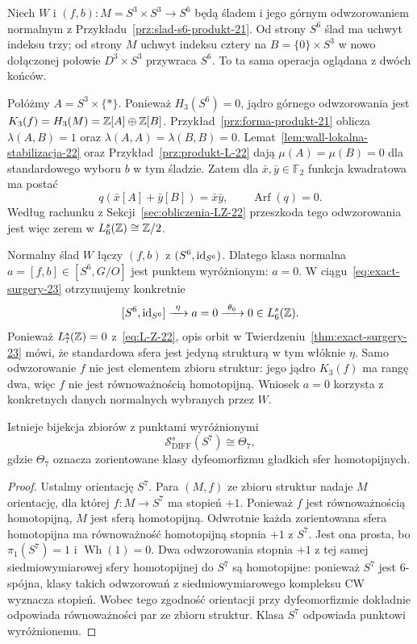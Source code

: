\clearpage
\begin{przyklad}
\label{prz:slad-s6-ciag-23}
Niech $W$ i $(f,b):M=S^3\times S^3\to S^6$
będą śladem i jego górnym odwzorowaniem normalnym z
Przykładu~\ref{prz:slad-s6-produkt-21}.
Od strony $S^6$ ślad ma uchwyt indeksu trzy;
od strony $M$ uchwyt indeksu cztery na
$B=\{0\}\times S^3$ w nowo dołączonej
połowie $D^3\times S^3$ przywraca $S^6$.
To ta sama operacja oglądana z dwóch końców.

Połóżmy $A=S^3\times\{*\}$. Ponieważ
$H_3(S^6)=0$, jądro górnego odwzorowania jest
$K_3(f)=H_3(M)=\mathbb{Z}[A]\oplus\mathbb{Z}[B]$.
Przykład~\ref{prz:forma-produkt-21} oblicza
$\lambda(A,B)=1$ oraz
$\lambda(A,A)=\lambda(B,B)=0$.
Lemat~\ref{lem:wall-lokalna-stabilizacja-22}
oraz Przykład~\ref{prz:produkt-L-22} dają
$\mu(A)=\mu(B)=0$ dla standardowego wyboru
$b$ w tym śladzie. Zatem dla
$\bar x,\bar y\in\mathbb F_2$ funkcja
kwadratowa ma postać
\[
 q(\bar x[A]+\bar y[B])=\bar x\bar y,
 \qquad \operatorname{Arf}(q)=0.
\]
Według rachunku z
Sekcji~\ref{sec:obliczenia-LZ-22}
przeszkoda tego odwzorowania jest więc zerem
w $L_6^s(\mathbb{Z})\cong\mathbb{Z}/2$.

Normalny ślad $W$ łączy $(f,b)$ z
$(S^6,\mathrm{id}_{S^6})$. Dlatego klasa normalna
$a=[f,b]\in[S^6,G/O]$ jest punktem wyróżnionym:
$a=0$. W ciągu~\eqref{eq:exact-surgery-23}
otrzymujemy konkretnie
\[
 [S^6,\mathrm{id}_{S^6}]
 \xrightarrow{\ \eta\ }a=0
 \xrightarrow{\ \theta_6\ }0\in L_6^s(\mathbb{Z}).
\]
Ponieważ $L_7^s(\mathbb{Z})=0$ z~\eqref{eq:L-Z-22},
opis orbit w
Twierdzeniu~\ref{thm:exact-surgery-23} mówi,
że standardowa sfera jest jedyną strukturą
w tym włóknie $\eta$.
Samo odwzorowanie $f$ nie jest elementem zbioru
struktur: jego jądro $K_3(f)$ ma rangę dwa,
więc $f$ nie jest równoważnością homotopijną.
Wniosek $a=0$ korzysta z konkretnych danych
normalnych wybranych przez $W$.
\end{przyklad}

\begin{stwierdzenie}
\label{prop:structure-set-seven-sphere-23}
Istnieje bijekcja zbiorów z punktami wyróżnionymi
\[
 \mathcal S^s_{\mathrm{DIFF}}(S^7)\cong\Theta_7,
\]
gdzie $\Theta_7$ oznacza zorientowane klasy
dyfeomorfizmu gładkich sfer homotopijnych.
\end{stwierdzenie}
\begin{proof}
Ustalmy orientację $S^7$.
Para $(M,f)$ ze zbioru struktur nadaje $M$
orientację, dla której $f:M\to S^7$ ma stopień
$+1$. Ponieważ $f$ jest równoważnością
homotopijną, $M$ jest sferą homotopijną.
Odwrotnie każda zorientowana sfera homotopijna
ma równoważność homotopijną stopnia $+1$
z $S^7$. Jest ona prosta, bo $\pi_1(S^7)=1$
i $\operatorname{Wh}(1)=0$.
Dwa odwzorowania stopnia $+1$ z tej samej
siedmiowymiarowej sfery homotopijnej
do $S^7$ są homotopijne: ponieważ $S^7$
jest $6$-spójna, klasy takich odwzorowań z
siedmiowymiarowego kompleksu CW
wyznacza stopień. Wobec tego zgodność
orientacji przy dyfeomorfizmie dokładnie
odpowiada równoważności par ze zbioru
struktur. Klasa $S^7$ odpowiada punktowi
wyróżnionemu.
\end{proof}


